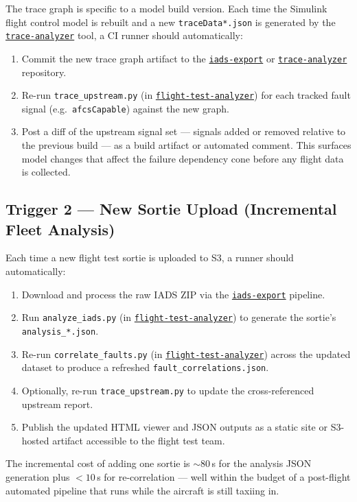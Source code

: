 \documentclass[11pt, letterpaper]{article}
\newcommand{\repoFTA}{\href{https://github.com/francis-barchesky/flight-test-analyzer}{\texttt{flight-test-analyzer}}}
\newcommand{\repoIADS}{\href{https://github.com/merlinlabs/iads-export}{\texttt{iads-export}}}
\newcommand{\repoTrace}{\href{https://github.com/francis-barchesky/trace-analyzer}{\texttt{trace-analyzer}}}
\begin{document}
The trace graph is specific to a model build version. Each time the Simulink
flight control model is rebuilt and a new \texttt{traceData*.json} is generated
by the \repoTrace{} tool, a CI runner should automatically:
\begin{enumerate}[itemsep=2pt]
  \item Commit the new trace graph artifact to the \repoIADS{} or
    \repoTrace{} repository.
  \item Re-run \texttt{trace\_upstream.py} (in \repoFTA{}) for each tracked
    fault signal (e.g.\ \texttt{afcsCapable}) against the new graph.
  \item Post a diff of the upstream signal set --- signals added or removed
    relative to the previous build --- as a build artifact or automated
    comment. This surfaces model changes that affect the failure dependency
    cone before any flight data is collected.
\end{enumerate}

\subsection{Trigger 2 --- New Sortie Upload (Incremental Fleet Analysis)}

Each time a new flight test sortie is uploaded to S3, a runner should
automatically:
\begin{enumerate}[itemsep=2pt]
  \item Download and process the raw IADS ZIP via the \repoIADS{} pipeline.
  \item Run \texttt{analyze\_iads.py} (in \repoFTA{}) to generate the sortie's
    \texttt{analysis\_*.json}.
  \item Re-run \texttt{correlate\_faults.py} (in \repoFTA{}) across the updated
    dataset to produce a refreshed \texttt{fault\_correlations.json}.
  \item Optionally, re-run \texttt{trace\_upstream.py} to update the
    cross-referenced upstream report.
  \item Publish the updated HTML viewer and JSON outputs as a static site or
    S3-hosted artifact accessible to the flight test team.
\end{enumerate}

The incremental cost of adding one sortie is $\sim\!80$\,s for the analysis
JSON generation plus $<\!10$\,s for re-correlation --- well within the budget of
a post-flight automated pipeline that runs while the aircraft is still taxiing
in.
\end{document}
